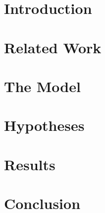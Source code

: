 \section{Introduction}


\section{Related Work}


\section{The Model}


\section{Hypotheses}


\section{Results}


\section{Conclusion}


